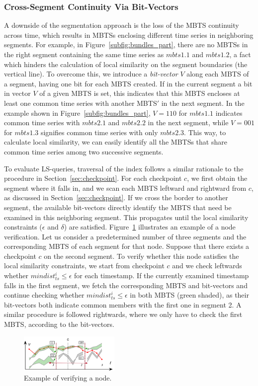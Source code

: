 \subsubsection{Cross-Segment Continuity Via Bit-Vectors}
\label{subsec:bit_vectors}
A downside of the segmentation approach is the loss of the MBTS continuity across time, which results in MBTSs enclosing different time series in neighboring segments. For example, in Figure~\ref{subfig:bundles_part}, there are no MBTSs in the right segment containing the same time series as $mbts1.1$ and $mbts1.2$, a fact which hinders the calculation of local similarity on the segment boundaries (the vertical line). To overcome this, we introduce a \textit{bit-vector} $V$ along each MBTS of a segment, having one bit for each MBTS created. If in the current segment a bit in vector $V$ of a given MBTS is set, this indicates that this MBTS encloses at least one common time series with another MBTS$'$ in the next segment. In the example shown in Figure~\ref{subfig:bundles_part}, $V=110$ for $mbts1.1$ indicates common time series with $mbts2.1$ and $mbts2.2$ in the next segment, while $V=001 $ for $mbts1.3$ signifies common time series with only $mbts2.3$. This way, to calculate local similarity, we can easily identify all the MBTSs that share common time series among two successive segments. 

To evaluate LS-queries, traversal of the \sbtsr index follows a similar rationale to the procedure in Section~\ref{sec:checkpoint}. For each checkpoint $c$, we first obtain the segment where it falls in, and we scan each MBTS leftward and rightward from $c$, as discussed in Section~\ref{sec:checkpoint}. If we cross the border to another segment, the available bit-vectors directly identify the MBTS that need be examined in this neighboring segment. This propagates until the local similarity constraints ($\epsilon$ and $\delta$) are satisfied. Figure~\ref{fig:part_checkpnt} illustrates an example of a node verification. Let us consider a predetermined number of three segments and the corresponding MBTS of each segment for that node. Suppose that there exists a checkpoint $c$ on the second segment. To verify whether this node satisfies the local similarity constraints, we start from checkpoint $c$ and we check leftwards whether $mindist_{ts}^{i} \leq \epsilon$ for each timestamp. If the currently examined timestamp falls in the first segment, we fetch the corresponding MBTS and bit-vectors and continue checking whether $mindist_{ts}^{i} \leq \epsilon$ in both MBTS (green shaded), as their bit-vectors both indicate common members with the first one in segment 2. A similar procedure is followed rightwards, where we only have to check the first MBTS, according to the bit-vectors.

\begin{figure}[tb]
    \centering
    \includegraphics[width=0.43\textwidth]{Figures/partition_checkpoint_check.png}
    \caption{Example of verifying a \sbtsr node.}
    \label{fig:part_checkpnt}
\end{figure}